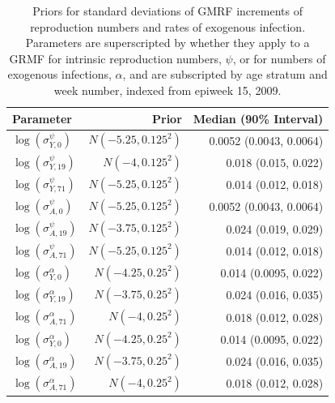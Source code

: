 \begin{table}[htbp]
	\caption[Priors for standard deviations of GMRF increments of reproduction numbers and rates of exogenous infection.]{Priors for standard deviations of GMRF increments of reproduction numbers and rates of exogenous infection. Parameters are superscripted by whether they apply to a GRMF for intrinsic reproduction numbers, $ \psi $, or for numbers of exogenous infections, $ \alpha $, and are subscripted by age stratum and week number, indexed from epiweek 15, 2009.}
	\label{key}
	\centering
	\begin{tabular}{lrr}
		\hline
		\textbf{Parameter} & \textbf{Prior} & \textbf{Median (90\% Interval)} \\ 
		\hline
		$ \log(\sigma^{\psi}_{Y,0}) $ & $ N(-5.25, 0.125^2) $ & 0.0052 (0.0043, 0.0064)\\
		$ \log(\sigma^{\psi}_{Y,19}) $ & $ N(-4, 0.125^2) $ & 0.018 (0.015, 0.022)\\
		$ \log(\sigma^{\psi}_{Y,71}) $ & $ N(-5.25, 0.125^2) $ & 0.014 (0.012, 0.018)\\
		$ \log(\sigma^{\psi}_{A,0}) $ & $ N(-5.25, 0.125^2) $ & 0.0052 (0.0043, 0.0064)\\
		$ \log(\sigma^{\psi}_{A,19}) $ & $ N(-3.75, 0.125^2) $ & 0.024 (0.019, 0.029)\\
		$ \log(\sigma^{\psi}_{A,71}) $ & $ N(-5.25, 0.125^2) $ & 0.014 (0.012, 0.018)\\
		$ \log(\sigma^{\alpha}_{Y,0}) $ & $ N(-4.25, 0.25^2) $ & 0.014 (0.0095, 0.022)\\
		$ \log(\sigma^{\alpha}_{Y,19}) $ & $ N(-3.75, 0.25^2) $ & 0.024 (0.016, 0.035)\\
		$ \log(\sigma^{\alpha}_{A,71}) $ & $ N(-4, 0.25^2) $ & 0.018 (0.012, 0.028)\\
			$ \log(\sigma^{\alpha}_{Y,0}) $ & $ N(-4.25, 0.25^2) $ & 0.014 (0.0095, 0.022)\\
		$ \log(\sigma^{\alpha}_{A,19}) $ & $ N(-3.75, 0.25^2) $ & 0.024 (0.016, 0.035)\\
		$ \log(\sigma^{\alpha}_{A,71}) $ & $ N(-4, 0.25^2) $ & 0.018 (0.012, 0.028)\\
		\hline
	\end{tabular}
\end{table}

